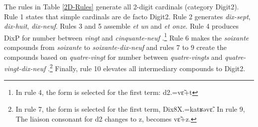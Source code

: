 \documentclass[output=paper]{langsci/langscibook}
\begin{document}
The rules in Table \ref{2D-Rules} generate all 2-digit cardinals  (category Digit2). Rule 1 states that simple cardinals  are de facto Digit2. Rule 2 generates \emph{dix-sept}, \emph{dix-huit}, \emph{dix-neuf}. Rules 3 and 5 assemble \emph{et un} and \emph{et onze}. Rule 4 produces DixP for number between \emph{vingt}  and \emph{cinquante-neuf} .\footnote{In rule 4, the \lplus{} form is selected for the first term: d2.\lplus{}=vɛ̃+t %
} Rule 6 makes the \emph{soixante} compounds  from \emph{soixante}  to \emph{soixante-dix-neuf}  and rules 7 to 9 create the compounds  based on \emph{quatre-vingt} for number between \emph{quatre-vingts}  and \emph{quatre-vingt-dix-neuf} .\footnote{In rule 7, the \lmoins{} form is selected for the first term,  Dix8X.\lmoins{}=katʁəvɛ̃. In rule 9, The liaison  consonant for d2 changes to z, \lplus{} becomes vɛ̃+z.} Finally, rule 10 elevates all intermediary compounds  to Digit2.


\begin{savenotes}
\begin{table}
\caption{Syntagmatic rules for 2-digit cardinals}
\label{2D-Rules}
\end{table}
\end{savenotes}
\end{document}
